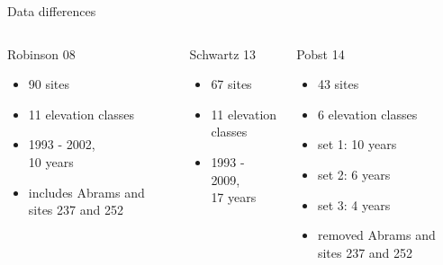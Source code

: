 \begin{frame}{Data differences}
			\begin{columns}[T]
				\begin{block}{Robinson 08}
					\begin{itemize}
						\item 90 sites
						\item 11 elevation classes		
						\item 1993 - 2002,\\ 10 years
						\item includes Abrams and sites 237 and 252
					\end{itemize}
				\end{block}
				\begin{block}{Schwartz 13}
					\begin{itemize}
						\item 67 sites
						\item 11 elevation classes
						\item 1993 - 2009,\\ 17 years
					\end{itemize}
				\end{block}
				\begin{block}{Pobst 14}
					\begin{itemize}
						\item 43 sites
						\item 6 elevation classes						
						\item set 1: 10 years
						\item set 2: 6 years
						\item set 3: 4 years
						\item removed Abrams and sites 237 and 252
					\end{itemize}
				\end{block}
			\end{columns}
		\end{frame}